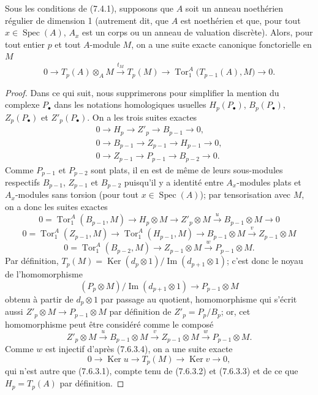 \begin{proposition}[7.6.3]
Sous les conditions de (7.4.1), supposons que $A$ soit un anneau noethérien
régulier de dimension 1 (autrement dit, que $A$ est noethérien et que, pour tout
$x\in\operatorname{Spec}(A)$, $A_x$ est un corps ou un anneau de valuation
discrète). Alors, pour tout entier $p$ et tout $A$-module $M$, on a une suite
exacte canonique fonctorielle en $M$
\[
  0
  \longrightarrow T_p(A)\otimes_A M
  \xrightarrow{t_M}T_p(M)
  \longrightarrow \operatorname{Tor}_1^A\bigl(T_{p-1}(A),M\bigr)
  \longrightarrow0.
  \tag{7.6.3.1}\label{III.7.6.3.1.fr}
\]
\end{proposition}

\begin{proof}
Dans ce qui suit, nous supprimerons pour simplifier la mention du complexe
$P_\bullet$ dans les notations homologiques usuelles $H_p(P_\bullet)$,
$B_p(P_\bullet)$, $Z_p(P_\bullet)$ et $Z'_p(P_\bullet)$. On a les trois suites
exactes
\begin{gather*}
  0\longrightarrow H_p\longrightarrow Z'_p\longrightarrow B_{p-1}
  \longrightarrow0,\\
  0\longrightarrow B_{p-1}\longrightarrow Z_{p-1}\longrightarrow H_{p-1}
  \longrightarrow0,\\
  0\longrightarrow Z_{p-1}\longrightarrow P_{p-1}\longrightarrow B_{p-2}
  \longrightarrow0.
\end{gather*}
Comme $P_{p-1}$ et $P_{p-2}$ sont plats, il en est de même de leurs
sous-modules respectifs $B_{p-1}$, $Z_{p-1}$ et $B_{p-2}$ puisqu'il y a
identité entre $A_x$-modules plats et $A_x$-modules sans torsion (pour tout
$x\in\operatorname{Spec}(A)$); par tensorisation avec $M$, on a donc les suites
exactes
\[
  0=\operatorname{Tor}_1^A(B_{p-1},M)
  \longrightarrow H_p\otimes M
  \longrightarrow Z'_p\otimes M
  \xrightarrow{u}B_{p-1}\otimes M
  \longrightarrow0
  \tag{7.6.3.2}\label{III.7.6.3.2.fr}
\]
\[
  0=\operatorname{Tor}_1^A(Z_{p-1},M)
  \longrightarrow\operatorname{Tor}_1^A(H_{p-1},M)
  \longrightarrow B_{p-1}\otimes M
  \xrightarrow{v}Z_{p-1}\otimes M
  \tag{7.6.3.3}\label{III.7.6.3.3.fr}
\]
\[
  0=\operatorname{Tor}_1^A(B_{p-2},M)
  \longrightarrow Z_{p-1}\otimes M
  \xrightarrow{w}P_{p-1}\otimes M.
  \tag{7.6.3.4}\label{III.7.6.3.4.fr}
\]
Par définition,
$T_p(M)=\operatorname{Ker}(d_p\otimes1)/\operatorname{Im}(d_{p+1}\otimes1)$;
c'est donc le noyau de l'homomorphisme
\[
  (P_p\otimes M)/\operatorname{Im}(d_{p+1}\otimes1)
  \longrightarrow P_{p-1}\otimes M
\]
obtenu à partir de $d_p\otimes1$ par passage au quotient, homomorphisme qui
s'écrit aussi $Z'_p\otimes M\to P_{p-1}\otimes M$ par définition de
$Z'_p=P_p/B_p$; or, cet homomorphisme peut être considéré comme le composé
\[
  Z'_p\otimes M
  \xrightarrow{u}B_{p-1}\otimes M
  \xrightarrow{v}Z_{p-1}\otimes M
  \xrightarrow{w}P_{p-1}\otimes M.
\]
Comme $w$ est injectif d'après (7.6.3.4), on a une suite exacte
\[
  0\longrightarrow\operatorname{Ker}u
  \longrightarrow T_p(M)
  \longrightarrow\operatorname{Ker}v
  \longrightarrow0,
\]
qui n'est autre que (7.6.3.1), compte tenu de (7.6.3.2) et (7.6.3.3) et de ce
que $H_p=T_p(A)$ par définition.
\end{proof}

